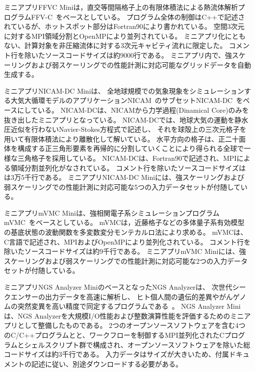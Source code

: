 ミニアプリFFVC Miniは，直交等間隔格子上の有限体積法による熱流体解析プログラムFFV-C~\cite{FFVC_ono2014}をベースとしている。
プログラム全体の制御はC++で記述されているが、ホットスポット部分はFortran90により書かれている。
空間3次元に対するMPI領域分割とOpenMPにより並列されている。
ミニアプリ化にともない、計算対象を非圧縮流体に対する3次元キャビティ流れに限定した。
コメント行を除いたソースコードサイズは約9000行である。
ミニアプリ内で、強スケーリングおよび弱スケーリングでの性能計測に対応可能なグリッドデータを自動生成する。

ミニアプリNICAM-DC Miniは、
全地球規模での気象現象をシミュレーションする大気大循環モデルのアプリケーションNICAM~\cite{NICAM_satoh2008}のサブセットNICAM-DC~\cite{NICAM-DC_url}をベースにしている。
NICAM-DCは、NICAMから力学過程(Dinamical Core)のみを抜き出したミニアプリとなっている。
NICAM-DCでは、地球大気の運動を静水圧近似を行わないNavier-Stokes方程式で記述し、
それを球殻上の三次元格子を用いて有限体積法により離散化して解いている。
水平方向の格子は、正二十面体を構成する正三角形要素を再帰的に分割していくことにより得られる全球で一様な三角格子を採用している。
NICAM-DCは、Fortran90で記述され、MPIによる領域分割並列化がなされている。
コメント行を除いたソースコードサイズはは3万5千行である。
ミニアプリNICAM-DC Miniには、強スケーリングおよび弱スケーリングでの性能計測に対応可能な5つの入力データセットが付随している。

ミニアプリmVMC Miniは、強相関電子系シミュレーションプログラムmVMC~\cite{mVMC_url}\cite{mVMC_tahara2008}をベースとしている。
mVMCは，近藤格子などの多体量子系有効模型の基底状態の波動関数を多変数変分モンテカルロ法により求める。
mVMCは、C言語で記述され、MPIおよびOpenMPにより並列化されている。
コメント行を除いたソースコードサイズは約9千行である。
ミニアプリmVMC Miniには、強スケーリングおよび弱スケーリングでの性能計測に対応可能な2つの入力データセットが付随している。

ミニアプリNGS Analyzer MiniのベースとなったNGS Analyzerは、
次世代シークエンサーの出力データを高速に解析し、
ヒト個人間の遺伝的差異やがんゲノムの突然変異を高い精度で同定するプログラムである~\cite{NGSA_url}。
NGS Analyzer Miniは、NGS Analyzerを大規模I/O性能および整数演算性能を評価するためのミニアプリとして整備したものである。
2つのオープンソースソフトウェアを含む4つのC/C++プログラムとと、ワークフローを制御するMPI並列化されたCプログラムとシェルスクリプト群で構成され、オープンソースソフトウェアを除いた総コードサイズは約3千行である。
入力データはサイズが大きいため、付属ドキュメントの記述に従い、別途ダウンロードする必要がある。

